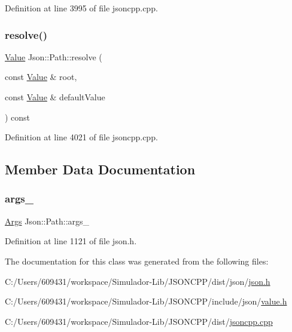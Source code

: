 Definition at line 3995 of file jsoncpp.\+cpp.

\hypertarget{class_json_1_1_path_ab65ab001ccdbc6f8b5f123da58b92539}{}\label{class_json_1_1_path_ab65ab001ccdbc6f8b5f123da58b92539} 
\subsubsection{\texorpdfstring{resolve()}{resolve()}\hspace{0.1cm}{\footnotesize\ttfamily [4/4]}}
{\footnotesize\ttfamily \hyperlink{class_json_1_1_value}{Value} Json\+::\+Path\+::resolve (\begin{DoxyParamCaption}\item[{const \hyperlink{class_json_1_1_value}{Value} \&}]{root,  }\item[{const \hyperlink{class_json_1_1_value}{Value} \&}]{default\+Value }\end{DoxyParamCaption}) const}



Definition at line 4021 of file jsoncpp.\+cpp.



\subsection{Member Data Documentation}
\hypertarget{class_json_1_1_path_af33d0de7ee9f99d3e361bdf504dc2bc7}{}\label{class_json_1_1_path_af33d0de7ee9f99d3e361bdf504dc2bc7} 
\subsubsection{\texorpdfstring{args\+\_\+}{args\_}}
{\footnotesize\ttfamily \hyperlink{class_json_1_1_path_a27d96232d034d7a78286468676f9cb3e}{Args} Json\+::\+Path\+::args\+\_\+\hspace{0.3cm}{\ttfamily [private]}}



Definition at line 1121 of file json.\+h.



The documentation for this class was generated from the following files\+:\begin{DoxyCompactItemize}
\item 
C\+:/\+Users/609431/workspace/\+Simulador-\/\+Lib/\+J\+S\+O\+N\+C\+P\+P/dist/json/\hyperlink{dist_2json_2json_8h}{json.\+h}\item 
C\+:/\+Users/609431/workspace/\+Simulador-\/\+Lib/\+J\+S\+O\+N\+C\+P\+P/include/json/\hyperlink{value_8h}{value.\+h}\item 
C\+:/\+Users/609431/workspace/\+Simulador-\/\+Lib/\+J\+S\+O\+N\+C\+P\+P/dist/\hyperlink{jsoncpp_8cpp}{jsoncpp.\+cpp}\end{DoxyCompactItemize}
